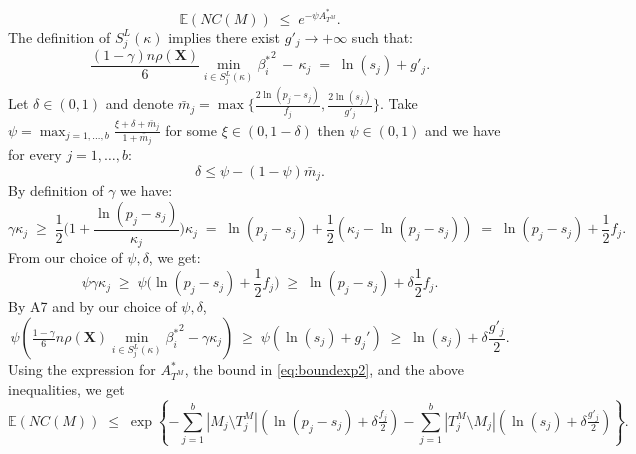 \documentclass[aos]{imsart}
\theoremstyle{plain}
\newcommand{\E}{\mathbb{E}}
\newcommand{\bs}{\boldsymbol}
\begin{document}
\begin{equation}\label{eq:boundexp2}
    \E(NC(M))\;\leq\;e^{-\psi A_{T^M}^*}.
\end{equation}
The definition of $S^{L}_j(\kappa)$ implies there exist $g'_j \to +\infty$ such that:
$$\frac{(1-\gamma) n\rho(\bs X)}{6}\min_{i\in S^{L}_j(\kappa)}{\beta^*_i}^{2}\,- \,\kappa_j \;=\; \ln(s_j) + g'_{j}.$$
Let $\delta \in (0,1)$ and denote $\bar{m}_j=\max\big\{\frac{2\ln(p_j-s_j)}{f_j},\frac{2\ln(s_j)}{g'_{j}}\big\}$. Take $\psi=\max_{j=1,\ldots,b}\frac{\xi + \delta + \bar{m}_j}{1+\bar{m}_j}$ for some $\xi \in(0, 1- \delta)$ then $\psi \in (0,1)$ and we have for every $j=1,\ldots,b$:
$$\delta \leq \psi-(1-\psi)\bar{m}_j.$$ 
By definition of $\gamma$ we have: 
$$
\gamma\kappa_j\;\geq\;\frac12 \Big(1+\frac{\ln(p_j-s_j)}{\kappa_j}\Big)\kappa_j\;=\;\ln(p_j-s_j)+\frac12(\kappa_j-\ln(p_j-s_j)) \;=\; \ln(p_j-s_j)+ \frac12f_j.
$$
From our choice of $\psi,\delta$, we get:
$$\psi\gamma\kappa_j \;\geq\; \psi\big(\ln(p_j-s_j)+ \frac12f_j\big) \;\geq\;  \ln(p_j-s_j)+ \delta\frac12f_j.$$
By A7 and by our choice of $\psi,\delta$,
$$\psi\left(\tfrac{1-\gamma}{6} n \rho(\bs X) \min_{i\in S^{L}_j(\kappa)}{\beta^*_i}^{2} - \gamma\kappa_j\right) \;\geq\; \psi\left(\ln(s_j)+g_j'\right) \;\geq\; \ln(s_j)+\delta \frac{g'_j}{2}.
$$
Using the expression for $A_{T^M}^*$, the bound in \eqref{eq:boundexp2}, and the above inequalities, we get
$$
\E(NC(M))\;\leq\;\exp\left\{- \sum_{j=1}^b |M_j\setminus T^M_j|(\ln(p_j-s_j)+\delta \tfrac{f_j}{2})-\sum_{j=1}^b |T^M_j\setminus M_j|(\ln(s_j)+\delta \tfrac{g'_j}{2})\right\}.
$$
\end{document}
